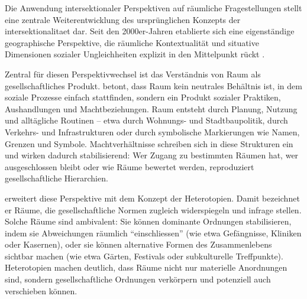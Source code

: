 \vspace{2em}

Die Anwendung intersektionaler Perspektiven auf räumliche Fragestellungen stellt eine zentrale Weiterentwicklung des ursprünglichen Konzepts der \gls{intersektionalitaet} dar. Seit den 2000er-Jahren etablierte sich eine eigenständige geographische Perspektive, die räumliche Kontextualität und situative Dimensionen sozialer Ungleichheiten explizit in den Mittelpunkt rückt \parencite{valentineTheorizingResearchingIntersectionality2007,rodo-de-zarateIntersectionalityFeministGeographies2018}.

Zentral für diesen Perspektivwechsel ist das Verständnis von Raum als gesellschaftliches Produkt. \textcite{lefebvreProductionLespace1974} betont, dass Raum kein neutrales Behältnis ist, in dem soziale Prozesse einfach stattfinden, sondern ein Produkt sozialer Praktiken, Aushandlungen und Machtbeziehungen. Raum entsteht durch Planung, Nutzung und alltägliche Routinen -- etwa durch Wohnungs- und Stadtbaupolitik, durch Verkehrs- und Infrastrukturen oder durch symbolische Markierungen wie Namen, Grenzen und Symbole. Machtverhältnisse schreiben sich in diese Strukturen ein und wirken dadurch stabilisierend: Wer Zugang zu bestimmten Räumen hat, wer ausgeschlossen bleibt oder wie Räume bewertet werden, reproduziert gesellschaftliche Hierarchien.

\textcite{foucaultEspacesAutres2004} erweitert diese Perspektive mit dem Konzept der Heterotopien. Damit bezeichnet er Räume, die gesellschaftliche Normen zugleich widerspiegeln und infrage stellen. Solche Räume sind ambivalent: Sie können dominante Ordnungen stabilisieren, indem sie Abweichungen räumlich \enquote{einschliessen} (wie etwa Gefängnisse, Kliniken oder Kasernen), oder sie können alternative Formen des Zusammenlebens sichtbar machen (wie etwa Gärten, Festivals oder subkulturelle Treffpunkte). Heterotopien machen deutlich, dass Räume nicht nur materielle Anordnungen sind, sondern gesellschaftliche Ordnungen verkörpern und potenziell auch verschieben können.

